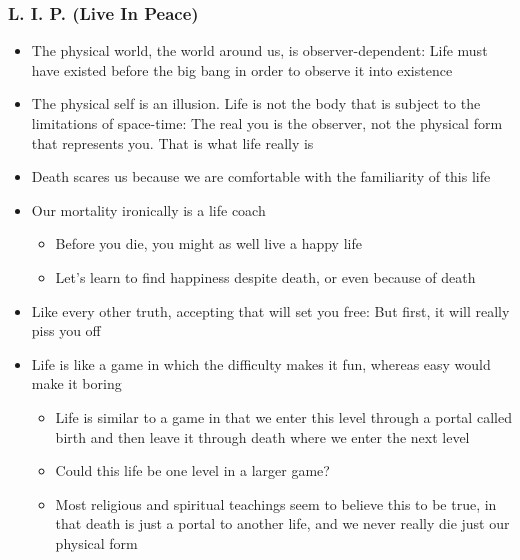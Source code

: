 \begin{frame}[fragile]\frametitle{L. I. P. (Live In Peace)}
\begin{itemize}
\item The physical world, the world around us, is observer-dependent: Life must have existed before the big bang in order to observe it into existence
\item The physical self is an illusion. Life is not the body that is subject to the limitations of space-time: The real you is the observer, not the physical form that represents you. That is what life really is
\item Death scares us because we are comfortable with the familiarity of this life
\item Our mortality ironically is a life coach
	\begin{itemize}
	\item Before you die, you might as well live a happy life
	\item Let’s learn to find happiness despite death, or even because of death
	\end{itemize}

\item Like every other truth, accepting that will set you free: But first, it will really piss you off
\item Life is like a game in which the difficulty makes it fun, whereas easy would make it boring
	\begin{itemize}
	\item Life is similar to a game in that we enter this level through a portal called birth and then leave it through death where we enter the next level
	\item Could this life be one level in a larger game?
	\item Most religious and spiritual teachings seem to believe this to be true, in that death is just a portal to another life, and we never really die just our physical form
	\end{itemize}
\end{itemize}

\end{frame}

